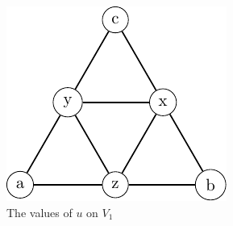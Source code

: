 \begin{figure}[h]
\centering
\includegraphics[scale=1]{g1.pdf}
\caption{The values of $u$ on $V_1$}\label{fig:g1}
\end{figure}

